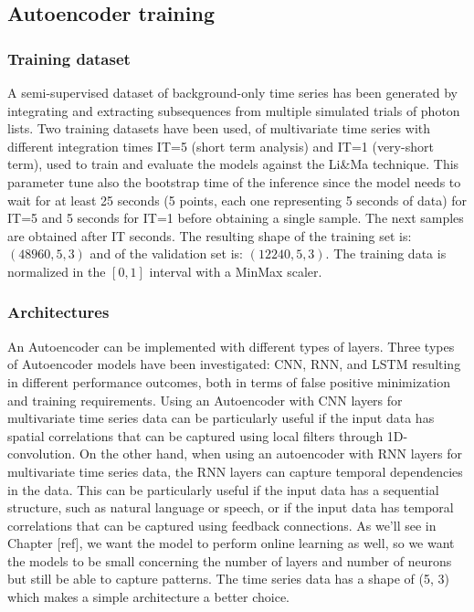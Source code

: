 \subsection{Autoencoder training}
\subsubsection{Training dataset}
A semi-supervised dataset of background-only time series has been generated by integrating and extracting subsequences from multiple simulated trials of photon lists. Two training datasets have been used, of multivariate time series with different integration times IT=5 (short term analysis) and IT=1 (very-short term), used to train and evaluate the models against the Li\&Ma technique. This parameter tune also the bootstrap time of the inference since the model needs to wait for at least 25 seconds (5 points, each one representing 5 seconds of data) for IT=5 and 5 seconds for IT=1 before obtaining a single sample. The next samples are obtained after IT seconds. The resulting shape of the training set is: $(48960, 5, 3)$ and of the validation set is: $(12240, 5, 3)$. The training data is normalized in the $[0, 1]$ interval with a MinMax scaler.

\subsubsection{Architectures}
An Autoencoder can be implemented with different types of layers. Three types of Autoencoder models have been investigated: CNN, RNN, and LSTM resulting in different performance outcomes, both in terms of false positive minimization and training requirements. Using an Autoencoder with CNN layers for multivariate time series data can be particularly useful if the input data has spatial correlations that can be captured using local filters through 1D-convolution. On the other hand, when using an autoencoder with RNN layers for multivariate time series data, the RNN layers can capture temporal dependencies in the data. This can be particularly useful if the input data has a sequential structure, such as natural language or speech, or if the input data has temporal correlations that can be captured using feedback connections. 
As we'll see in Chapter [ref], we want the model to perform online learning as well, so we want the models to be small concerning the number of layers and number of neurons but still be able to capture patterns. The time series data has a shape of (5, 3) which makes a simple architecture a better choice. 

